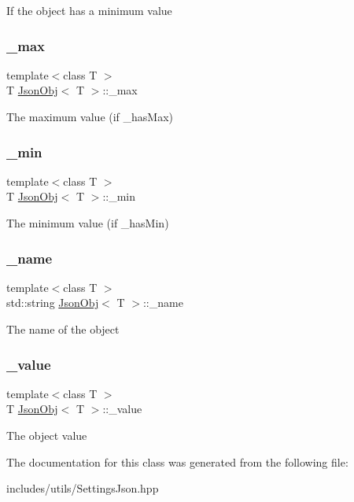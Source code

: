 If the object has a minimum value \mbox{\label{class_json_obj_a8c3b17a54d952923f7197afd4d26d998}} 
\subsubsection{\texorpdfstring{\+\_\+max}{\_max}}
{\footnotesize\ttfamily template$<$class T $>$ \\
T \hyperlink{class_json_obj}{Json\+Obj}$<$ T $>$\+::\+\_\+max\hspace{0.3cm}{\ttfamily [protected]}}

The maximum value (if \+\_\+has\+Max) \mbox{\label{class_json_obj_ac4d168c820d320463dc040ad0f6e8100}} 
\subsubsection{\texorpdfstring{\+\_\+min}{\_min}}
{\footnotesize\ttfamily template$<$class T $>$ \\
T \hyperlink{class_json_obj}{Json\+Obj}$<$ T $>$\+::\+\_\+min\hspace{0.3cm}{\ttfamily [protected]}}

The minimum value (if \+\_\+has\+Min) \mbox{\label{class_json_obj_a134e8965a7952fcdfc76d0cec76b1251}} 
\subsubsection{\texorpdfstring{\+\_\+name}{\_name}}
{\footnotesize\ttfamily template$<$class T $>$ \\
std\+::string \hyperlink{class_json_obj}{Json\+Obj}$<$ T $>$\+::\+\_\+name\hspace{0.3cm}{\ttfamily [protected]}}

The name of the object \mbox{\label{class_json_obj_a93a0b5cd814d2eaea8f7a365410b9007}} 
\subsubsection{\texorpdfstring{\+\_\+value}{\_value}}
{\footnotesize\ttfamily template$<$class T $>$ \\
T \hyperlink{class_json_obj}{Json\+Obj}$<$ T $>$\+::\+\_\+value\hspace{0.3cm}{\ttfamily [protected]}}

The object value 

The documentation for this class was generated from the following file\+:\begin{DoxyCompactItemize}
\item 
includes/utils/Settings\+Json.\+hpp\end{DoxyCompactItemize}
